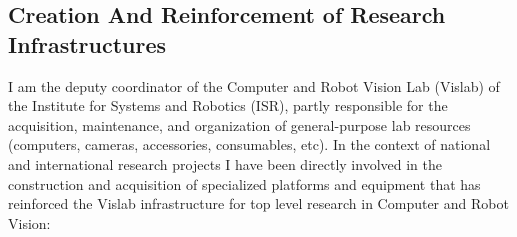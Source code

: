 \documentclass[
]{article}
\begin{document}
\subsection{Creation And Reinforcement of Research
Infrastructures}\label{creation-and-reinforcement-of-research-infrastructures}

I am the deputy coordinator of the Computer and Robot Vision Lab
(Vislab) of the Institute for Systems and Robotics (ISR), partly
responsible for the acquisition, maintenance, and organization of
general-purpose lab resources (computers, cameras, accessories,
consumables, etc). In the context of national and international research
projects I have been directly involved in the construction and
acquisition of specialized platforms and equipment that has reinforced
the Vislab infrastructure for top level research in Computer and Robot
Vision:
\end{document}
